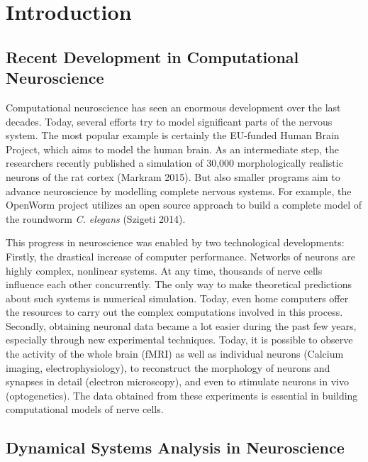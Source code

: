 \documentclass[12pt,a4paper,]{report}
\begin{document}
\tableofcontents

\chapter{Introduction}\label{introduction}

\section{Recent Development in Computational
Neuroscience}\label{recent-development-in-computational-neuroscience}

Computational neuroscience has seen an enormous development over the
last decades. Today, several efforts try to model significant parts of
the nervous system. The most popular example is certainly the EU-funded
Human Brain Project, which aims to model the human brain. As an
intermediate step, the researchers recently published a simulation of
30,000 morphologically realistic neurons of the rat cortex (Markram
2015). But also smaller programs aim to advance neuroscience by
modelling complete nervous systems. For example, the OpenWorm project
utilizes an open source approach to build a complete model of the
roundworm \emph{C. elegans} (Szigeti 2014).

This progress in neuroscience was enabled by two technological
developments: Firstly, the drastical increase of computer performance.
Networks of neurons are highly complex, nonlinear systems. At any time,
thousands of nerve cells influence each other concurrently. The only way
to make theoretical predictions about such systems is numerical
simulation. Today, even home computers offer the resources to carry out
the complex computations involved in this process. Secondly, obtaining
neuronal data became a lot easier during the past few years, especially
through new experimental techniques. Today, it is possible to observe
the activity of the whole brain (fMRI) as well as individual neurons
(Calcium imaging, electrophysiology), to reconstruct the morphology of
neurons and synapses in detail (electron microscopy), and even to
stimulate neurons in vivo (optogenetics). The data obtained from these
experiments is essential in building computational models of nerve
cells.

\section{Dynamical Systems Analysis in
Neuroscience}\label{dynamical-systems-analysis-in-neuroscience}
\end{document}
